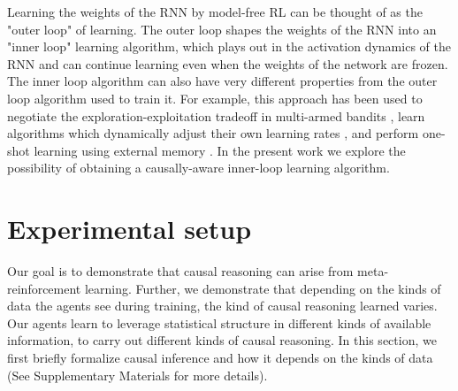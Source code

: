 Learning the weights of the RNN by model-free RL can be thought of as the "outer loop" of learning. The outer loop shapes the weights of the RNN into an "inner loop" learning algorithm, which plays out in the activation dynamics of the RNN and can continue learning even when the weights of the network are frozen. The inner loop algorithm can also have very different properties from the outer loop algorithm used to train it. For example, this approach has been used to negotiate the exploration-exploitation tradeoff in multi-armed bandits \citep{duan2016RL2, wang2016}, learn algorithms which dynamically adjust their own learning rates \citep{wang2016,wang2018}, and perform one-shot learning using external memory \citep{santoro2016meta}. In the present work we explore the possibility of obtaining a causally-aware inner-loop learning algorithm.



\section{Experimental setup}
\label{sec:probspec}
Our goal is to demonstrate that causal reasoning can arise from meta-reinforcement learning. Further, we demonstrate that depending on the kinds of data the agents see during training, the kind of causal reasoning learned varies. Our agents learn to leverage statistical structure in different kinds of available information, to carry out different kinds of causal reasoning. In this section, we first briefly formalize causal inference and how it depends on the kinds of data (See Supplementary Materials for more details).




